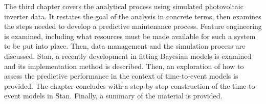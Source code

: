 The third chapter covers the analytical process using simulated photovoltaic inverter data. It restates the goal of the analysis in concrete terms, then examines the steps needed to develop a predictive maintenance process. Feature engineering is examined, including what resources must be made available for such a system to be put into place. Then, data management and the simulation process are discussed. Stan, a recently development in fitting Bayesian models is examined and its implementation method is described. Then, an exploration of how to assess the predictive performance in the context of time-to-event models is provided. The chapter concludes with a step-by-step construction of the time-to-event models in Stan. Finally, a summary of the material is provided.




